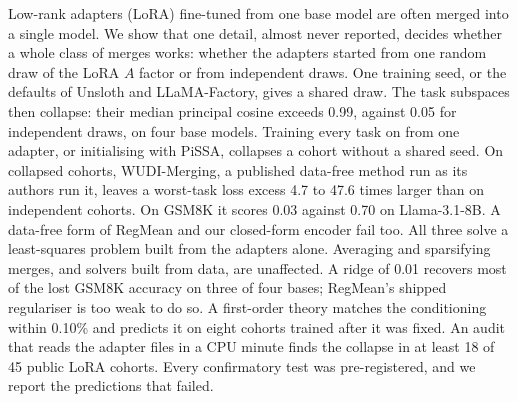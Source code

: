 Low-rank adapters (LoRA) fine-tuned from one base model are often merged into
a single model. We show that one detail, almost never reported, decides
whether a whole class of merges works: whether the adapters started from one
random draw of the LoRA $A$ factor or from independent draws. One training
seed, or the defaults of Unsloth and LLaMA-Factory, gives a shared draw. The
task subspaces then collapse: their median principal cosine exceeds 0.99,
against 0.05 for independent draws, on four base models. Training every
task on from one adapter, or
initialising with PiSSA, collapses a cohort without a shared seed. On
collapsed cohorts, WUDI-Merging, a published data-free method run as its
authors run it, leaves a worst-task loss excess 4.7 to 47.6 times larger than
on independent cohorts. On GSM8K it scores 0.03 against 0.70 on Llama-3.1-8B.
A data-free form of RegMean and our closed-form encoder fail too. All three
solve a least-squares problem built from the adapters alone. Averaging and
sparsifying merges, and solvers built from data, are unaffected. A ridge of
0.01 recovers most of the lost GSM8K accuracy on three of four bases;
RegMean's shipped regulariser is too weak to do so. A first-order theory
matches the conditioning within 0.10\% and predicts it on eight cohorts
trained after it was fixed. An audit that reads the adapter files in
a CPU minute finds the collapse in at least 18 of 45 public LoRA cohorts.
Every confirmatory test was pre-registered, and we report the predictions
that failed.
